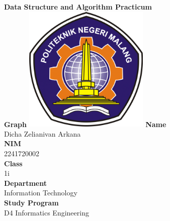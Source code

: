 \documentclass[12pt,titlepage]{article}
\newcommand{\vSubject}{Data Structure and Algorithm Practicum}
\newcommand{\vSubtitle}{Graph}
\newcommand{\vName}{Dicha Zelianivan Arkana}
\newcommand{\vNIM}{2241720002}
\newcommand{\vClass}{1i}
\newcommand{\vDepartment}{Information Technology}
\newcommand{\vStudyProgram}{D4 Informatics Engineering}
\begin{document}
\begin{titlepage}
    \centering
    \vfill
    {\bfseries\LARGE
        \vSubject\\
        \vskip0.25cm
        \vSubtitle
    }
    \vfill
    \includegraphics[width=6cm]{images/polinema-logo.png}
    \vfill
    {
        \textbf{Name}\\
        \vName\\
        \vskip0.5cm
        \textbf{NIM}\\
        \vNIM\\
        \vskip0.5cm
        \textbf{Class}\\
        \vClass\\
        \vskip0.5cm
        \textbf{Department}\\
        \vDepartment\\
        \vskip0.5cm
        \textbf{Study Program}\\
        \vStudyProgram
    }
\end{titlepage}
\end{document}
